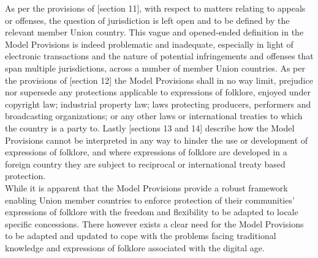 \documentclass[11pt]{article}
\begin{document}
As per the provisions of [section
11]\cite{wipo85_model_provi_national_laws_folklore}, with respect to matters
relating to appeals or offenses, the question of jurisdiction is left open and
to be defined by the relevant member Union country. This vague and opened-ended
definition in the Model Provisions is indeed problematic and inadequate,
especially in light of electronic transactions and the nature of potential
infringements and offenses that span multiple jurisdictions, across a number of
member Union countries. As per the provisions of [section
12]\cite{wipo85_model_provi_national_laws_folklore} the Model Provisions shall in
no way limit, prejudice nor supersede any protections applicable to expressions
of folklore, enjoyed under copyright law; industrial property law; laws
protecting producers, performers and broadcasting organizations; or any other
laws or international treaties to which the country is a party to. Lastly
[sections 13 and 14]\cite{wipo85_model_provi_national_laws_folklore} describe how
the Model Provisions cannot be interpreted in any way to hinder the use or
development of expressions of folklore, and where expressions of folklore are
developed in a foreign country they are subject to reciprocal or international
treaty based protection.\\

While it is apparent that the Model Provisions provide a robust framework
enabling Union member countries to enforce protection of their communities'
expressions of folklore with the freedom and flexibility to be adapted to locale
specific concessions. There however exists a clear need for the Model Provisions
to be adapted and updated to cope with the problems facing traditional knowledge
and expressions of folklore associated with the digital age.

\printbibliography
\end{document}
